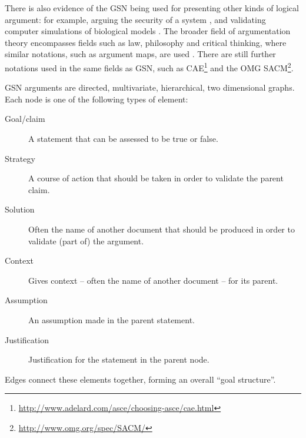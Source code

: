 There is also evidence of the GSN being used for presenting other kinds of logical argument:
for example,
arguing the security of a system \cite{plop},
and validating computer simulations of biological models \cite{insilico,royal}.
The broader field of argumentation theory encompasses fields such as law, philosophy and critical thinking, where similar notations, such as argument maps, are used \citep[pp.~3--6]{open1}.
There are still further notations used in the same fields as GSN, such as
CAE\footnote{\url{http://www.adelard.com/asce/choosing-asce/cae.html}}
and the OMG SACM\footnote{\url{http://www.omg.org/spec/SACM/}}.

GSN arguments are directed, multivariate, hierarchical, two dimensional graphs.
Each node is one of the following types of element:

\begin{description}

  \item[ Goal/claim ]
    A statement that can be assessed to be true or false.

  \item[ Strategy]
    A course of action that should be taken in order to validate the parent claim.
  
  \item[ Solution]
    Often the name of another document that should be produced in order to validate (part of) the argument.

  \item[ Context]
    Gives context -- often the name of another document -- for its parent.

  \item[ Assumption]
    An assumption made in the parent statement.

  \item[ Justification]
     Justification for the statement in the parent node.

\end{description}

Edges connect these elements together, forming an overall ``goal structure''. 

